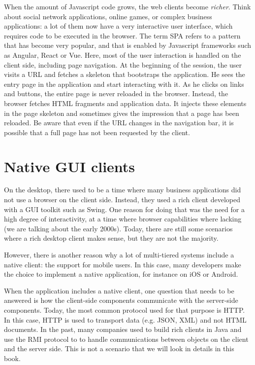 When the amount of Javascript code grows, the web clients become \emph{richer}. Think about social network applications, online games, or complex business applications: a lot of them now have a very interactive user interface, which requires code to be executed in the browser. The term \ac{SPA} refers to a pattern that has become very popular, and that is enabled by Javascript frameworks such as Angular, React or Vue. Here, most of the user interaction is handled on the client side, including page navigation. At the beginning of the session, the user visits a URL and fetches a skeleton that bootstraps the application. He sees the entry page in the application and start interacting with it. As he clicks on links and buttons, the entire page is never reloaded in the browser. Instead, the browser fetches HTML fragments and application data. It injects these elements in the page skeleton and sometimes gives the impression that a page has been reloaded. Be aware that even if the URL changes in the navigation bar, it is possible that a full page has not been requested by the client.

\section{Native GUI clients}


On the desktop, there used to be a time where many business applications did not use a browser on the client side. Instead, they used a rich client developed with a GUI toolkit such as Swing. One reason for doing that was the need for a high degree of interactivity, at a time where browser capabilities where lacking (we are talking about the early 2000s). Today, there are still some scenarios where a rich desktop client makes sense, but they are not the majority.

However, there is another reason why a lot of multi-tiered systems include a native client: the support for mobile users. In this case, many developers make the choice to implement a native application, for instance on iOS or Android.

When the application includes a native client, one question that needs to be answered is how the client-side components communicate with the server-side components. Today, the most common protocol used for that purpose is HTTP. In this case, HTTP is used to transport data (e.g. JSON, XML) and not HTML documents. In the past, many companies used to build rich clients in Java and use the \ac{RMI} protocol to to handle communications between objects on the client and the server side. This is not a scenario that we will look in details in this book.

